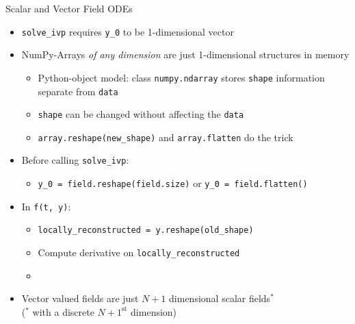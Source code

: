 
\begin{frame}{Scalar and Vector Field ODEs}
%
\begin{itemize}
\item \texttt{solve\_ivp} requires \texttt{y\_0} to be 1-dimensional vector
\item NumPy-Arrays \emph{of any dimension} are just 1-dimensional structures in memory
	\begin{itemize}
	\item Python-object model: class \texttt{numpy.ndarray} stores \texttt{shape} information separate from \texttt{data}
	\item \texttt{shape} can be changed without affecting the \texttt{data}
	\item \texttt{array.reshape(new\_shape)} and \texttt{array.flatten} do the trick
	\end{itemize}
\item Before calling \texttt{solve\_ivp}:
	\begin{itemize}
	\item \texttt{y\_0 = field.reshape(field.size)} or \texttt{y\_0 = field.flatten()}
	\end{itemize}
\item In \texttt{f(t, y)}:
	\begin{itemize}
	\item \texttt{locally\_reconstructed = y.reshape(old\_shape)}
	\item Compute derivative on \texttt{locally\_reconstructed}
	\item {}
	\end{itemize}
\item Vector valued fields are just $N+1$ dimensional scalar fields$^{*}$\\
 {\scriptsize($^{*}$ with a discrete $N+1^{\text{st}}$ dimension)}
\end{itemize}
%
\end{frame}


